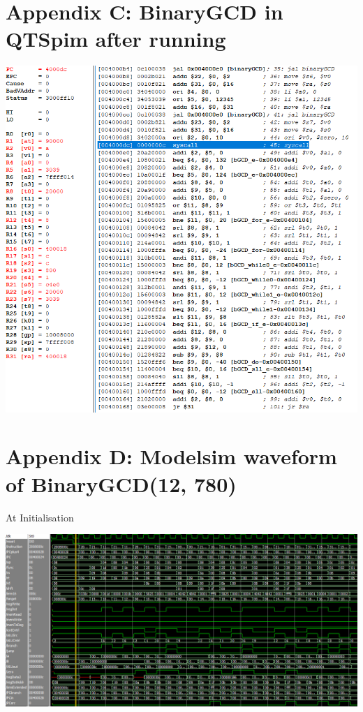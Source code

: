 \documentclass[12pt,letterpaper,titlepage]{article}
\begin{document}
\begin{raggedright}
\section{Appendix C: BinaryGCD in QTSpim after running}
\begin{center}
\includegraphics[width=\textwidth, height=\textheight, keepaspectratio=true]{post}
\end{center}

\clearpage
\section{Appendix D: Modelsim waveform of BinaryGCD(12, 780)}
\begin{center}

At Initialisation

\includegraphics[width=\textwidth, height=\textheight, keepaspectratio=true]{wav_pre}


\end{center}
\end{raggedright}
\end{document}
